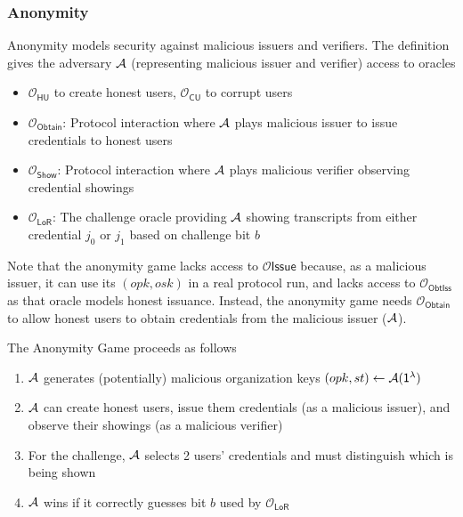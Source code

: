 \newpage
\subsubsection{Anonymity}
Anonymity models security against malicious issuers and verifiers. The definition gives the adversary $\mathcal{A}$ (representing malicious issuer and verifier) access to oracles
\begin{itemize}
    \item $\mathcal{O}_{\mathsf{HU}}$ to create honest users, $\mathcal{O}_{\mathsf{CU}}$ to corrupt users
    \item $\mathcal{O}_{\mathsf{Obtain}}$: Protocol interaction where $\mathcal{A}$ plays malicious issuer to issue credentials to honest users
    \item $\mathcal{O}_{\mathsf{Show}}$: Protocol interaction where $\mathcal{A}$ plays malicious verifier observing credential showings
    \item $\mathcal{O}_{\mathsf{LoR}}$: The challenge oracle providing $\mathcal{A}$ showing transcripts from either credential $j_0$ or $j_1$ based on challenge bit $b$
\end{itemize}
Note that the anonymity game lacks access to $\mathcal{O}{\mathsf{Issue}}$ because, as a malicious issuer, it can use its $(opk, osk)$ in a real protocol run, and lacks access to $\mathcal{O}_{\mathsf{ObtIss}}$ as that oracle models honest issuance. Instead, the anonymity game needs $\mathcal{O}_{\mathsf{Obtain}}$ to allow honest users to obtain credentials from the malicious issuer ($\mathcal{A}$).

\noindent The Anonymity Game proceeds as follows
\begin{enumerate}
    \item $\mathcal{A}$ generates (potentially) malicious organization keys $(opk, st) \gets \mathcal{A}(\mathsf{1^{\lambda}})$
    \item $\mathcal{A}$ can create honest users, issue them credentials (as a malicious issuer), and observe their showings (as a malicious verifier)
    \item For the challenge, $\mathcal{A}$ selects 2 users' credentials and must distinguish which is being shown
    \item $\mathcal{A}$ wins if it correctly guesses bit $b$ used by $\mathcal{O}_{\mathsf{LoR}}$
\end{enumerate}

